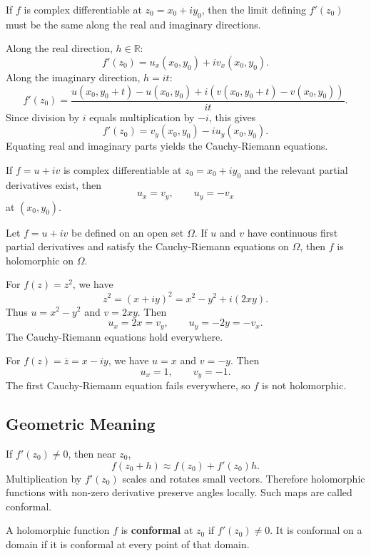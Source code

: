 If $f$ is complex differentiable at $z_0=x_0+iy_0$, then the limit defining $f'(z_0)$ must be the same along the real and imaginary directions.

Along the real direction, $h\in\mathbb{R}$:
\[
    f'(z_0)=u_x(x_0,y_0)+iv_x(x_0,y_0).
\]
Along the imaginary direction, $h=it$:
\[
    f'(z_0)=\frac{u(x_0,y_0+t)-u(x_0,y_0)+i(v(x_0,y_0+t)-v(x_0,y_0))}{it}.
\]
Since division by $i$ equals multiplication by $-i$, this gives
\[
    f'(z_0)=v_y(x_0,y_0)-iu_y(x_0,y_0).
\]
Equating real and imaginary parts yields the Cauchy-Riemann equations.

\begin{theorem}
If $f=u+iv$ is complex differentiable at $z_0=x_0+iy_0$ and the relevant partial derivatives exist, then
\[
    u_x=v_y,
    \qquad
    u_y=-v_x
\]
at $(x_0,y_0)$.
\end{theorem}

\begin{theorem}
Let $f=u+iv$ be defined on an open set $\Omega$. If $u$ and $v$ have continuous first partial derivatives and satisfy the Cauchy-Riemann equations on $\Omega$, then $f$ is holomorphic on $\Omega$.
\end{theorem}

\begin{example}
For $f(z)=z^2$, we have
\[
    z^2=(x+iy)^2=x^2-y^2+i(2xy).
\]
Thus $u=x^2-y^2$ and $v=2xy$. Then
\[
    u_x=2x=v_y,
    \qquad
    u_y=-2y=-v_x.
\]
The Cauchy-Riemann equations hold everywhere.
\end{example}

\begin{example}
For $f(z)=\overline{z}=x-iy$, we have $u=x$ and $v=-y$. Then
\[
    u_x=1,
    \qquad
    v_y=-1.
\]
The first Cauchy-Riemann equation fails everywhere, so $f$ is not holomorphic.
\end{example}

\subsection{Geometric Meaning}

If $f'(z_0)\neq 0$, then near $z_0$,
\[
    f(z_0+h)\approx f(z_0)+f'(z_0)h.
\]
Multiplication by $f'(z_0)$ scales and rotates small vectors. Therefore holomorphic functions with non-zero derivative preserve angles locally. Such maps are called conformal.

\begin{definition}
A holomorphic function $f$ is \textbf{conformal} at $z_0$ if $f'(z_0)\neq 0$. It is conformal on a domain if it is conformal at every point of that domain.
\end{definition}

